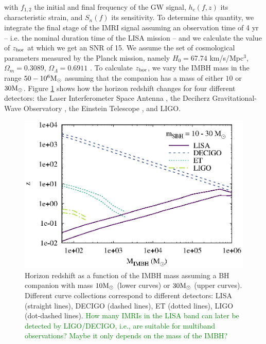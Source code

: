 \documentclass[twocolumn]{aastex62}
\newcommand{\Ms}{{\rm M}_\odot}
\newcommand{\xian}{\textcolor{green}}
\begin{document}
with $f_{1,2}$ the initial and final frequency of the GW signal, $h_c(f,z)$ its characteristic strain, and $S_n(f)$ its sensitivity. To determine this quantity, we integrate the final stage of the IMRI signal assuming an observation time of 4 yr -- i.e. the nominal duration time of the LISA mission -- and we calculate the value of $z_{\rm hor}$ at which we get an SNR of 15. We assume the set of cosmological parameters measured by the Planck mission, namely $H_0 = 67.74$ km/s/Mpc$^{3}$, $\Omega_m = 0.3089$, $\Omega_\Lambda = 0.6911$ \citep{planck15}. To calculate $z_{\rm hor}$, we vary the IMBH mass in the range $50-10^6\Ms$ assuming that the companion has a mass of either $10$ or $30\Ms$. Figure \ref{fig:fhor} shows how the horizon redshift changes for four different detectors: the Laser Interferometer Space Antenna \citep[LISA\footnote{\url{https://www.elisascience.org/}},][]{amaro12}, the Deciherz Gravitational-Wave Observatory \citep[DECIGO\footnote{\url{http://tamago.mtk.nao.ac.jp/spacetime/decigo_e.html}},][]{seto01}, the Einstein Telescope \citep[ET\footnote{\url{http://www.et-gw.eu/}},][]{punturo10}, and LIGO. 


\begin{figure}
\centering
\includegraphics[width=\columnwidth]{horizon_IMBH}
\caption{Horizon redshift as a function of the IMBH mass assuming a BH companion with mass $10 \Ms$ (lower curves) or $30\Ms$ (upper curves). Different curve collections correspond to different detectors: LISA (straight lines), DECIGO (dashed lines), ET (dotted lines), LIGO (dot-dashed lines). \xian{How many IMRIs in the LISA band can later be detected by LIGO/DECIGO, i.e., are suitable for multiband observations? Maybe it only depends on the mass of the IMBH?}}
\label{fig:fhor}
\end{figure}
\end{document}

